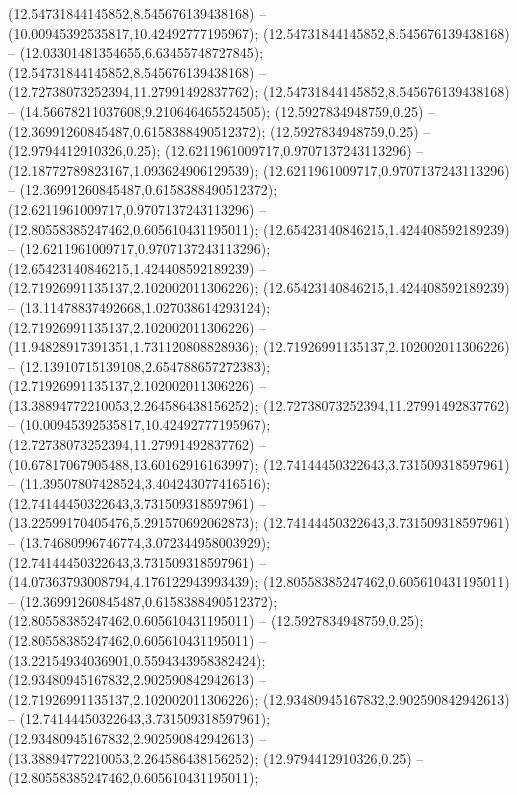  (12.54731844145852,8.545676139438168) -- (10.00945392535817,10.42492777195967);
 (12.54731844145852,8.545676139438168) -- (12.03301481354655,6.63455748727845);
 (12.54731844145852,8.545676139438168) -- (12.72738073252394,11.27991492837762);
 (12.54731844145852,8.545676139438168) -- (14.56678211037608,9.210646465524505);
 (12.5927834948759,0.25) -- (12.36991260845487,0.6158388490512372);
 (12.5927834948759,0.25) -- (12.9794412910326,0.25);
 (12.6211961009717,0.9707137243113296) -- (12.18772789823167,1.093624906129539);
 (12.6211961009717,0.9707137243113296) -- (12.36991260845487,0.6158388490512372);
 (12.6211961009717,0.9707137243113296) -- (12.80558385247462,0.605610431195011);
 (12.65423140846215,1.424408592189239) -- (12.6211961009717,0.9707137243113296);
 (12.65423140846215,1.424408592189239) -- (12.71926991135137,2.102002011306226);
 (12.65423140846215,1.424408592189239) -- (13.11478837492668,1.027038614293124);
 (12.71926991135137,2.102002011306226) -- (11.94828917391351,1.731120808828936);
 (12.71926991135137,2.102002011306226) -- (12.13910715139108,2.654788657272383);
 (12.71926991135137,2.102002011306226) -- (13.38894772210053,2.264586438156252);
 (12.72738073252394,11.27991492837762) -- (10.00945392535817,10.42492777195967);
 (12.72738073252394,11.27991492837762) -- (10.67817067905488,13.60162916163997);
 (12.74144450322643,3.731509318597961) -- (11.39507807428524,3.404243077416516);
 (12.74144450322643,3.731509318597961) -- (13.22599170405476,5.291570692062873);
 (12.74144450322643,3.731509318597961) -- (13.74680996746774,3.072344958003929);
 (12.74144450322643,3.731509318597961) -- (14.07363793008794,4.176122943993439);
 (12.80558385247462,0.605610431195011) -- (12.36991260845487,0.6158388490512372);
 (12.80558385247462,0.605610431195011) -- (12.5927834948759,0.25);
 (12.80558385247462,0.605610431195011) -- (13.22154934036901,0.5594343958382424);
 (12.93480945167832,2.902590842942613) -- (12.71926991135137,2.102002011306226);
 (12.93480945167832,2.902590842942613) -- (12.74144450322643,3.731509318597961);
 (12.93480945167832,2.902590842942613) -- (13.38894772210053,2.264586438156252);
 (12.9794412910326,0.25) -- (12.80558385247462,0.605610431195011);
